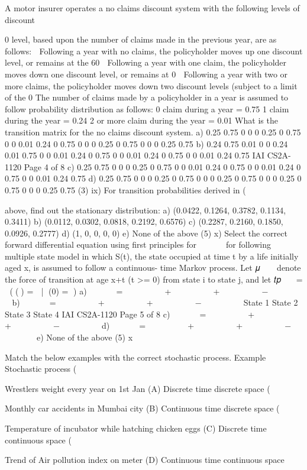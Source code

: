 \documentclass[a4paper,12pt]{article}
\begin{document}
\item     A motor insurer operates a no claims discount system with the following levels of
discount {0%
level, based upon the number of claims made in the previous year, are as follows:
 Following a year with no claims, the policyholder moves up one discount level,
or remains at the 60%
 Following a year with one claim, the policyholder moves down one discount
level, or remains at 0%
 Following a year with two or more claims, the policyholder moves down two
discount levels (subject to a limit of the 0%
The number of claims made by a policyholder in a year is assumed to follow probability
distribution as follows:
0 claim during a year = 0.75
1 claim during the year = 0.24
2 or more claim during the year = 0.01
What is the transition matrix for the no claims discount system.
a)
0.25 0.75 0 0 0
0.25 0 0.75 0 0
0.01 0.24 0 0.75 0
0 0 0.25 0 0.75
0 0 0 0.25 0.75
b)
0.24 0.75 0.01 0 0
0.24 0.01 0.75 0 0
0.01 0.24 0 0.75 0
0 0.01 0.24 0 0.75
0 0 0.01 0.24 0.75
IAI CS2A-1120
Page 4 of 8
c)
0.25 0.75 0 0 0
0.25 0 0.75 0 0
0.01 0.24 0 0.75 0
0 0.01 0.24 0 0.75
0 0 0.01 0.24 0.75
d)
0.25 0.75 0 0 0
0.25 0 0.75 0 0
0 0.25 0 0.75 0
0 0 0.25 0 0.75
0 0 0 0.25 0.75
(3)
ix) For transition probabilities derived in (\item     above, find out the stationary distribution:
a) (0.0422, 0.1264, 0.3782, 0.1134, 0.3411)
b) (0.0112, 0.0302, 0.0818, 0.2192, 0.6576)
c) (0.2287, 0.2160, 0.1850, 0.0926, 0.2777)
d) (1, 0, 0, 0, 0)
e) None of the above
(5)
x) Select the correct forward differential equation using first principles for 􀰡􀳟􀯣􀳣
􀰮􀰰
􀰡􀯧
for
following multiple state model in which S(t), the state occupied at time t by a life
initially aged x, is assumed to follow a continuous- time Markov process.
Let 𝜇􀯫􀬾􀯧
􀯜􀯝 denote the force of transition at age x+t (t >= 0) from state i to state j, and let
𝑡𝑝
􀯫
􀯜􀯝
= 𝑃 (𝑆(𝑡) = 𝑗 | 𝑆(0) = 𝑖)
a) 􀰡􀳟􀯣􀳣
􀰮􀰰
􀰡􀯧
= 𝑡𝑝
􀯫
􀬶􀬵
𝜇􀯫􀬾􀯧
􀬵􀬸 + 𝑡𝑝
􀯫
􀬶􀬷
𝜇􀯫􀬾􀯧
􀬷􀬸 + 𝑡𝑝
􀯫
􀬶􀬸
𝜇􀯫􀬾􀯧
􀬸􀬸 − 𝑡𝑝
􀯫
􀬶􀬶
𝜇􀯫􀬾􀯧
􀬶􀬸
b) 􀰡􀳟􀯣􀳣
􀰮􀰰
􀰡􀯧
= 𝑡𝑝
􀯫
􀬶􀬷
𝜇􀯫􀬾􀯧
􀬷􀬸 + 𝑡𝑝
􀯫
􀬶􀬵
𝜇􀯫􀬾􀯧
􀬵􀬸 + 𝑡𝑝
􀯫
􀬶􀬸
𝜇􀯫􀬾􀯧
􀬸􀬶 − 𝑡𝑝
􀯫
􀬶􀬶
𝜇􀯫􀬾􀯧
􀬶􀬸
State 1 State 2 State 3
State 4
IAI CS2A-1120
Page 5 of 8
c) 􀰡􀳟􀯣􀳣
􀰮􀰰
􀰡􀯧
= 𝑡𝑝
􀯫
􀬶􀬷
𝜇􀯫􀬾􀯧
􀬷􀬸 + 𝑡𝑝
􀯫
􀬶􀬵
𝜇􀯫􀬾􀯧
􀬵􀬸 + 𝑡𝑝
􀯫
􀬶􀬵
𝜇􀯫􀬾􀯧
􀬵􀬶 − 𝑡𝑝
􀯫
􀬶􀬸
𝜇􀯫􀬾􀯧
􀬸􀬶
d) 􀰡􀳟􀯣􀳣
􀰮􀰰
􀰡􀯧
= 𝑡𝑝
􀯫
􀬶􀬵
𝜇􀯫􀬾􀯧
􀬵􀬸 + 𝑡𝑝
􀯫
􀬶􀬷
𝜇􀯫􀬾􀯧
􀬷􀬸 + 𝑡𝑝
􀯫
􀬶􀬶
𝜇􀯫􀬾􀯧
􀬶􀬸 − 𝑡𝑝
􀯫
􀬶􀬸
𝜇􀯫􀬾􀯧
􀬸􀬶
e) None of the above
(5)
x\item  Match the below examples with the correct stochastic process.
Example Stochastic process
(\item  Wrestlers weight every year on 1st Jan (A) Discrete time discrete space
(\item   Monthly car accidents in Mumbai city (B) Continuous time discrete space
(\item    Temperature of incubator while hatching
chicken eggs
(C) Discrete time continuous space
(\item  Trend of Air pollution index on meter (D) Continuous time continuous space

}
\end{document}
